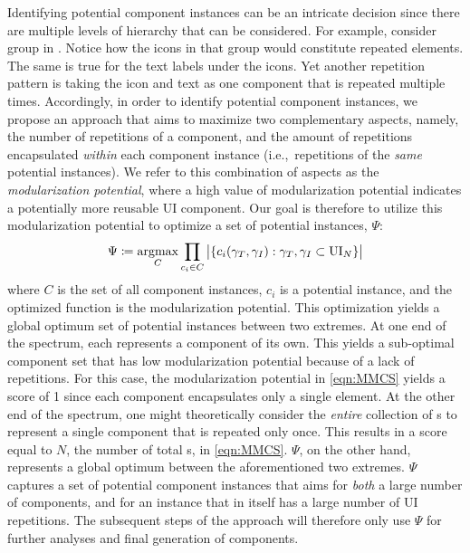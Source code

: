 Identifying potential component instances can be an intricate decision since there are multiple levels of hierarchy that can be considered.
For example, consider group  in .
Notice how the icons in that group would constitute repeated elements.
The same is true for the text labels under the icons.
Yet another repetition pattern is taking the icon and text as one component that is repeated multiple times. 
Accordingly, in order to identify potential component instances, we propose an approach that aims to maximize two complementary aspects, namely, 
the number of repetitions of a component,
and the amount of repetitions encapsulated \emph{within} each component instance (i.e.,~repetitions of the \emph{same} potential instances).
We refer to this combination of aspects as the \emph{modularization potential}, where a high value of modularization potential indicates a potentially more reusable UI component.
Our goal is therefore to utilize this modularization potential to optimize a set of potential instances, $\Psi$:
\begin{equation} \label{eqn:MMCS}
\Psi \coloneqq \operatorname*{argmax}_{C} \prod_{c_i \in C} \big\lvert \{c_i(\gamma_T, \gamma_I) : \gamma_T, \gamma_I \subset \mathrm{UI}_N\} \big\rvert
\end{equation}
where $C$ is the set of all component instances, $c_i$ is a potential instance, and the optimized function is the modularization potential.
This optimization yields a global optimum set of potential instances between two extremes.
At one end of the spectrum,
each {\VizElem} represents a component of its own.
This yields a sub-optimal component set that has low modularization potential because of a lack of repetitions.
For this case, the modularization potential in \cref{eqn:MMCS} yields a score of 1 since each component encapsulates only a single element.
At the other end of the spectrum,
one might theoretically consider the \emph{entire} collection of {\VizElem}s to represent a single component that is repeated only once.
This results in a score equal to $N$, the number of total {\VizElem}s, in \cref{eqn:MMCS}.
$\Psi$, on the other hand, represents a global optimum between the aforementioned two extremes. $\Psi$ captures a set of potential component instances that aims for \emph{both} a large number of components, and for an instance that in itself has a large number of UI repetitions.
The subsequent steps of the approach will therefore only use $\Psi$ for further analyses and final generation of components.

